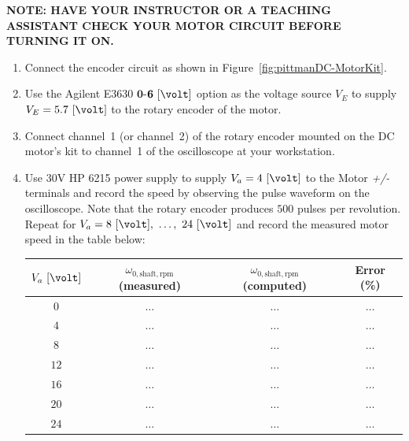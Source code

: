 \begin{mdframed}
  {\bf NOTE: HAVE YOUR INSTRUCTOR OR A TEACHING ASSISTANT CHECK YOUR MOTOR CIRCUIT BEFORE TURNING IT ON.}  
\end{mdframed}

\begin{enumerate}
\item Connect the encoder circuit as shown in Figure~\ref{fig:pittmanDC-MotorKit}. 
\item Use the Agilent E3630 $\mathbf{0}$-$\mathbf{6}~[\volt]$ option  as the voltage source $V_E$ to supply $V_E = 5.7~[\volt]$ to the rotary encoder of the motor.
\item Connect channel~1 (or channel~2) of the rotary encoder mounted on the DC motor's kit to channel~1 of the oscilloscope at your workstation. 
\item Use $30$V HP 6215  power supply to supply $V_a=4~[\volt]$ to the Motor \emph{+/-} terminals and record the speed by observing the pulse waveform on the oscilloscope. Note that the rotary encoder produces $500$ pulses per revolution. Repeat for $V_a=8~[\volt],~\ldots,~24~[\volt]$ and record the measured motor speed in the table below: %
%
  \begin{center}
    \begin{tabular}{c|c|c|c}
      \toprule
      $V_a~[\volt]$ &  $\omega_{0,\mathrm{shaft, rpm}}$ (measured)&  $\omega_{0,\mathrm{shaft,rpm}}$ (computed) & Error (\%)\\
      \toprule
      $0$ & $\ldots$ & $\ldots$& $\ldots$\\
      $4$ & $\ldots$ & $\ldots$& $\ldots$ \\
      $8$ & $\ldots$ & $\ldots$& $\ldots$ \\
      $12$ & $\ldots$ & $\ldots$& $\ldots$ \\
      $16$ & $\ldots$ & $\ldots$& $\ldots$ \\
      $20$ & $\ldots$ & $\ldots$& $\ldots$ \\
      $24$ & $\ldots$ & $\ldots$& $\ldots$ \\
      \bottomrule
    \end{tabular}    
  \end{center}


\end{enumerate}
